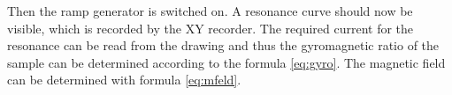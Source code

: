 Then the ramp generator is switched on. A resonance curve should now be visible, which is recorded by the XY recorder.
The required current for the resonance can be read from the drawing and thus the gyromagnetic ratio of the sample can be determined
according to the formula \ref{eq:gyro}. The magnetic field can be determined with formula \ref{eq:mfeld}.
